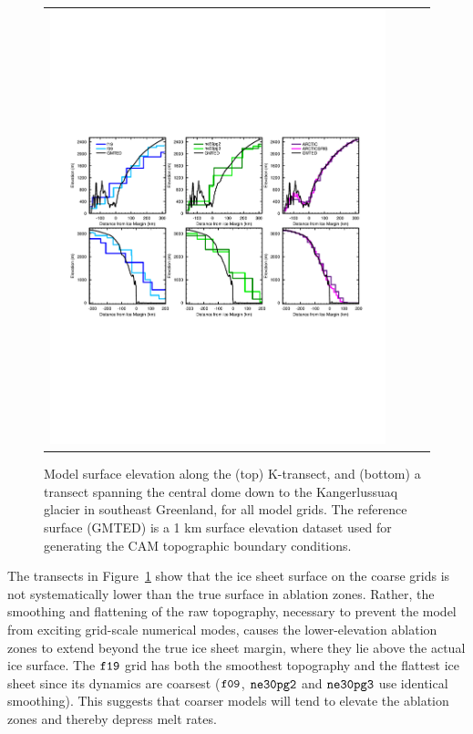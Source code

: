 \documentclass[draft]{agujournal2019}
\begin{document}
\begin{figure}[t]
\begin{center}
\begin{tabular}{cccc}
         \includegraphics[width=130mm]{figs/temp_zsects.pdf}
\end{tabular}
\end{center}
\caption{Model surface elevation along the (top) K-transect, and (bottom) a transect spanning the central dome down to the Kangerlussuaq glacier in southeast Greenland, for all model grids. The reference surface (GMTED) is a 1 km surface elevation dataset used for generating the CAM topographic boundary conditions. }
\label{fig:ztrans}
\end{figure}

The transects in Figure~\ref{fig:ztrans} show that the ice sheet surface on the coarse grids is not systematically lower than the true surface in ablation zones. Rather, the smoothing and flattening of the raw topography, necessary to prevent the model from exciting grid-scale numerical modes, causes the lower-elevation ablation zones to extend beyond the true ice sheet margin, where they lie above the actual ice surface. The $\tt f19$ grid has both the smoothest topography and the flattest ice sheet since its dynamics are coarsest ($\tt f09$, $\tt ne30pg2$ and $\tt ne30pg3$ use identical smoothing). This suggests that coarser models will tend to elevate the ablation zones and thereby depress melt rates.
\end{document}
